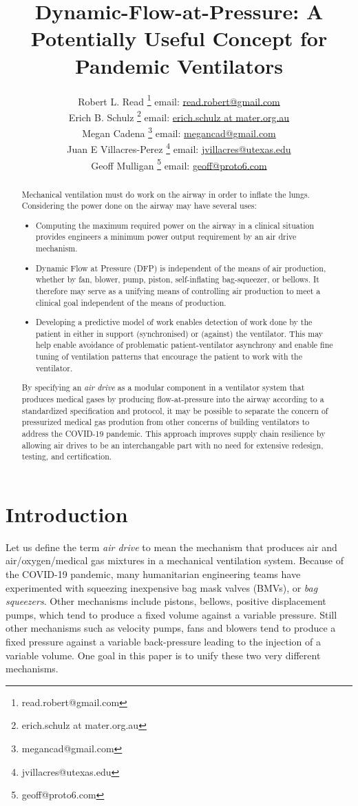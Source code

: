 \documentclass[conference]{article}
\title{Dynamic-Flow-at-Pressure: A Potentially Useful Concept for Pandemic Ventilators}
\author{Robert L. Read
  \thanks{read.robert@gmail.com}
  email: \href{mailto:read.robert@gmail.com}{read.robert@gmail.com}\\
  Erich B. Schulz
  \thanks{ erich.schulz at mater.org.au}
  email: \href{mailto:erich.schulz at mater.org.au}{erich.schulz at mater.org.au}\\
Megan Cadena
  \thanks{megancad@gmail.com}
  email: \href{mailto:megancad@gmail.com}{megancad@gmail.com}\\
  Juan E Villacres-Perez
  \thanks{jvillacres@utexas.edu}
  email: \href{mailto:jvillacres@utexas.edu}{jvillacres@utexas.edu}\\
  Geoff Mulligan
  \thanks{geoff@proto6.com }
  email: \href{mailto:geoff@proto6.com}{geoff@proto6.com }
  }
\begin{document}
\maketitle
\begin{abstract}
  Mechanical ventilation must do work on the airway in order to inflate the lungs.
  Considering the power done on the airway may have several uses:
  \begin{itemize}
  \item Computing the maximum required power on the airway in
    a clinical situation provides engineers a minimum power output requirement
    by an air drive mechanism.
  \item Dynamic Flow at Pressure (DFP) is independent of the means of air production,
    whether by fan, blower, pump, piston, self-inflating bag-squeezer, or bellows.
    It therefore
    may serve as a unifying means of controlling air production to meet
    a clinical goal independent of the means of production.
    \item Developing a predictive model of work enables detection of work done by the patient in either in support (synchronised) or (against) the ventilator.  This may help enable avoidance of problematic patient-ventilator asynchrony and enable fine tuning of ventilation patterns that encourage the patient to work with the ventilator.
  \end{itemize}
  By specifying an {\em air drive} as a modular component in a ventilator
  system that produces medical gases by producing flow-at-pressure into the airway according to a
  standardized specification and protocol, it may be possible to
  separate the concern of pressurized medical gas
  prodution from other concerns of building
  ventilators to address the COVID-19 pandemic. This approach improves
  supply chain resilience by allowing air drives to be an interchangable part with
  no need for extensive redesign, testing, and certification.
\end{abstract}


\section{Introduction}

Let us define the term {\em air drive} to mean the mechanism that
produces air and air/oxygen/medical gas mixtures in a mechanical
ventilation system. Because of the
COVID-19 pandemic, many humanitarian engineering teams have
experimented with squeezing inexpensive bag mask valves (BMVs), or
{\em bag squeezers}.
Other mechanisms include pistons, bellows,
positive displacement pumps, which tend to produce a fixed volume against
a variable pressure.
Still other mechanisms such as velocity pumps,
fans and blowers tend to produce a fixed
pressure against a variable back-pressure leading to the injection
of a variable volume. One goal in this paper is to unify these
two very different mechanisms.
\end{document}
